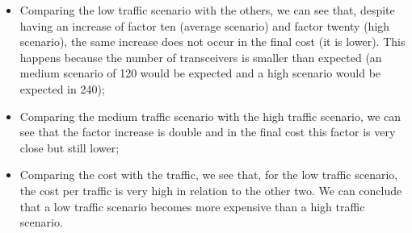 \begin{itemize}
    \item Comparing the low traffic scenario with the others, we can see that, despite having an increase of factor ten (average scenario) and factor twenty (high scenario), the same increase does not occur in the final cost (it is lower). This happens because the number of transceivers is smaller than expected (an medium scenario of 120 would be expected and a high scenario would be expected in 240);
    \item Comparing the medium traffic scenario with the high traffic scenario, we can see that the factor increase is double and in the final cost this factor is very close but still lower;
    \item Comparing the cost with the traffic, we see that, for the low traffic scenario, the cost per traffic is very high in relation to the other two. We can conclude that a low traffic scenario becomes more expensive than a high traffic scenario.
\end{itemize}
